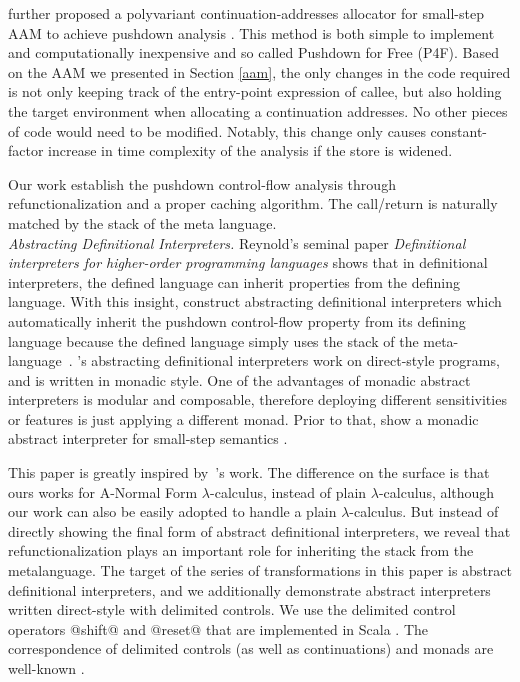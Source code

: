 \documentclass[acmsmall]{acmart}\settopmatter{}
\begin{document}
\citeauthor{gilray2016pushdown} further proposed a polyvariant continuation-addresses allocator
for small-step AAM to achieve pushdown analysis \cite{gilray2016pushdown}.
This method is both simple to implement and computationally inexpensive and so called Pushdown 
for Free (P4F). Based on the AAM we presented in Section \ref{aam}, the only changes in the 
code required is not only keeping track of the entry-point expression of callee, but also 
holding the target environment when allocating a continuation addresses.
No other pieces of code would need to be modified.
Notably, this change only causes constant-factor increase in time complexity of
the analysis if the store is widened.

Our work establish the pushdown control-flow analysis through refunctionalization and a
proper caching algorithm. The call/return is naturally matched by the stack of 
the meta language. \\

\textit{Abstracting Definitional Interpreters.}
Reynold's seminal paper \emph{Definitional interpreters for higher-order programming languages} 
\cite{Reynolds:72, Reynolds:HOSC98-revisited} shows that in
definitional interpreters, the defined language can inherit properties from the defining language.
With this insight, \citeauthor{darais2017abstracting} construct abstracting
definitional interpreters which automatically inherit the pushdown control-flow
property from its defining language because the defined language simply uses the stack of the
meta-language~\cite{darais2017abstracting}. \citeauthor{darais2017abstracting}'s abstracting
definitional interpreters work on direct-style programs, and is written in monadic style. One
of the advantages of monadic abstract interpreters is modular and composable, therefore
deploying different sensitivities or features is just applying a different monad.
Prior to that, \citeauthor{Sergey:2013:MAI:2491956.2491979} show a monadic
abstract interpreter for small-step semantics \cite{Sergey:2013:MAI:2491956.2491979}.

This paper is greatly inspired by~\citeauthor{darais2017abstracting}'s work.
The difference on the surface is that ours works for A-Normal Form $\lambda$-calculus,
instead of plain $\lambda$-calculus, although our work can also be easily adopted to handle a plain
$\lambda$-calculus.
But instead of directly showing the final form of abstract definitional interpreters,
we reveal that refunctionalization plays an important role for inheriting the
stack from the metalanguage.
The target of the series of transformations in this paper is abstract definitional
interpreters, and we additionally demonstrate abstract interpreters written direct-style with
delimited controls. 
We use the delimited control operators @shift@ and @reset@ that are implemented in Scala 
\cite{rompf2009implementing}. The correspondence of delimited controls (as well as continuations) 
and monads are well-known \cite{Danvy:1990:AC:91556.91622, wadler1992essence, danvy1992representing, moggi1991notions}.
\end{document}
